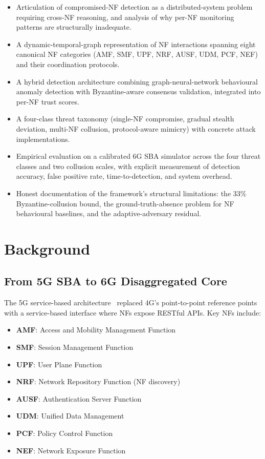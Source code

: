 \documentclass[sigconf,nonacm]{acmart}
\begin{document}
\begin{itemize}
  \item Articulation of compromised-NF detection as a
        distributed-system problem requiring cross-NF reasoning,
        and analysis of why per-NF monitoring patterns are
        structurally inadequate.
  \item A dynamic-temporal-graph representation of NF interactions
        spanning eight canonical NF categories (AMF, SMF, UPF, NRF,
        AUSF, UDM, PCF, NEF) and their coordination protocols.
  \item A hybrid detection architecture combining graph-neural-network
        behavioural anomaly detection with Byzantine-aware
        consensus validation, integrated into per-NF trust
        scores.
  \item A four-class threat taxonomy (single-NF compromise,
        gradual stealth deviation, multi-NF collusion,
        protocol-aware mimicry) with concrete attack
        implementations.
  \item Empirical evaluation on a calibrated 6G SBA simulator
        across the four threat classes and two collusion scales,
        with explicit measurement of detection accuracy, false
        positive rate, time-to-detection, and system overhead.
  \item Honest documentation of the framework's structural
        limitations: the 33\% Byzantine-collusion bound, the
        ground-truth-absence problem for NF behavioural
        baselines, and the adaptive-adversary residual.
\end{itemize}

\section{Background}

\subsection{From 5G SBA to 6G Disaggregated Core}

The 5G service-based architecture~\cite{3gpp2024sba} replaced 4G's
point-to-point reference points with a service-based interface where
NFs expose RESTful APIs. Key NFs include:

\begin{itemize}
  \item \textbf{AMF}: Access and Mobility Management Function
  \item \textbf{SMF}: Session Management Function
  \item \textbf{UPF}: User Plane Function
  \item \textbf{NRF}: Network Repository Function (NF discovery)
  \item \textbf{AUSF}: Authentication Server Function
  \item \textbf{UDM}: Unified Data Management
  \item \textbf{PCF}: Policy Control Function
  \item \textbf{NEF}: Network Exposure Function
\end{itemize}
\end{document}
